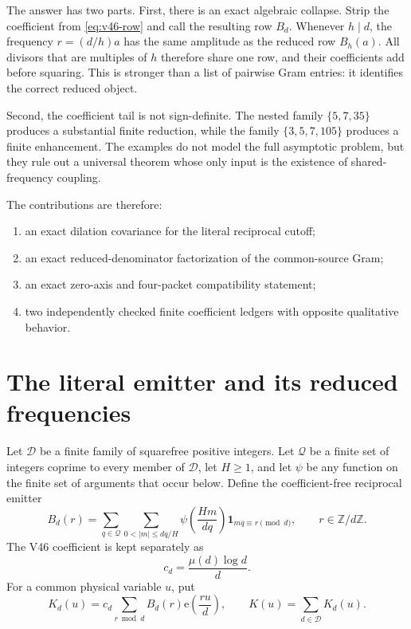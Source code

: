 \documentclass[11pt]{article}
\theoremstyle{definition}
\theoremstyle{remark}
\newcommand{\ZZ}{\mathbb Z}
\newcommand{\one}{\mathbf 1}
\newcommand{\Dd}{\mathcal D}
\newcommand{\QQ}{\mathcal Q}
\newcommand{\ee}{\mathrm e}
\newcommand{\muM}{\mu}
\begin{document}
The answer has two parts.  First, there is an exact algebraic collapse.  Strip
the coefficient from \eqref{eq:v46-row} and call the resulting row $B_d$.
Whenever $h\mid d$, the frequency $r=(d/h)a$ has the same amplitude as the
reduced row $B_h(a)$.  All divisors that are multiples of $h$ therefore share
one row, and their coefficients add before squaring.  This is stronger than a
list of pairwise Gram entries: it identifies the correct reduced object.

Second, the coefficient tail is not sign-definite.  The nested family
$\{5,7,35\}$ produces a substantial finite reduction, while the family
$\{3,5,7,105\}$ produces a finite enhancement.  The examples do not model the
full asymptotic problem, but they rule out a universal theorem whose only input
is the existence of shared-frequency coupling.

The contributions are therefore:
\begin{enumerate}[leftmargin=2em]
 \item an exact dilation covariance for the literal reciprocal cutoff;
 \item an exact reduced-denominator factorization of the common-source Gram;
 \item an exact zero-axis and four-packet compatibility statement;
 \item two independently checked finite coefficient ledgers with opposite
       qualitative behavior.
\end{enumerate}

\section{The literal emitter and its reduced frequencies}

Let $\Dd$ be a finite family of squarefree positive integers.  Let $\QQ$ be a
finite set of integers coprime to every member of $\Dd$, let $H\ge 1$, and let
$\psi$ be any function on the finite set of arguments that occur below.  Define
the coefficient-free reciprocal emitter
\begin{equation}
 B_d(r)=\sum_{q\in\QQ}\sum_{0<|m|\le dq/H}
 \psi\!\left(\frac{Hm}{dq}\right)
 \one_{m\overline q\equiv r\pmod d},
 \qquad r\in\ZZ/d\ZZ.
 \label{eq:emitter}
\end{equation}
The V46 coefficient is kept separately as
\begin{equation}
 c_d=\frac{\muM(d)\log d}{d}.
 \label{eq:coefficient}
\end{equation}
For a common physical variable $u$, put
\begin{equation}
 K_d(u)=c_d\sum_{r\bmod d}B_d(r)\ee\!\left(\frac{ru}{d}\right),
 \qquad K(u)=\sum_{d\in\Dd}K_d(u).
 \label{eq:kernel}
\end{equation}
\end{document}
